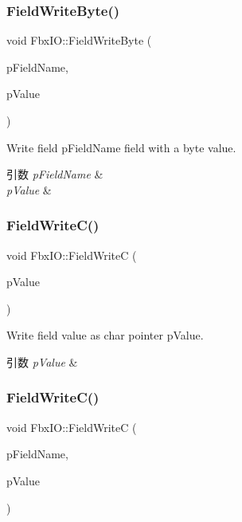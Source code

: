 \subsubsection{\texorpdfstring{Field\+Write\+Byte()}{FieldWriteByte()}\hspace{0.1cm}{\footnotesize\ttfamily [2/2]}}
{\footnotesize\ttfamily void Fbx\+I\+O\+::\+Field\+Write\+Byte (\begin{DoxyParamCaption}\item[{const char $\ast$}]{p\+Field\+Name,  }\item[{\hyperlink{fbxtypes_8h_a34067dfe395a7cf3040b7b263c9024d2}{Fbx\+Char}}]{p\+Value }\end{DoxyParamCaption})}

Write field p\+Field\+Name field with a byte value. 
\begin{DoxyParams}{引数}
{\em p\+Field\+Name} & \\
\hline
{\em p\+Value} & \\
\hline
\end{DoxyParams}
\mbox{\label{class_fbx_i_o_a4e4efe93bb869b9d71441a90c4a648c9}} 
\subsubsection{\texorpdfstring{Field\+Write\+C()}{FieldWriteC()}\hspace{0.1cm}{\footnotesize\ttfamily [1/2]}}
{\footnotesize\ttfamily void Fbx\+I\+O\+::\+Field\+WriteC (\begin{DoxyParamCaption}\item[{const char $\ast$}]{p\+Value }\end{DoxyParamCaption})}

Write field value as char pointer p\+Value. 
\begin{DoxyParams}{引数}
{\em p\+Value} & \\
\hline
\end{DoxyParams}
\mbox{\label{class_fbx_i_o_ae96f0aa4e1cdf6e6ea07beca3ecc4a28}} 
\subsubsection{\texorpdfstring{Field\+Write\+C()}{FieldWriteC()}\hspace{0.1cm}{\footnotesize\ttfamily [2/2]}}
{\footnotesize\ttfamily void Fbx\+I\+O\+::\+Field\+WriteC (\begin{DoxyParamCaption}\item[{const char $\ast$}]{p\+Field\+Name,  }\item[{const char $\ast$}]{p\+Value }\end{DoxyParamCaption})}


